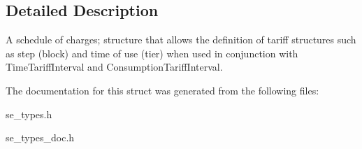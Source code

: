\subsection{Detailed Description}
A schedule of charges; structure that allows the definition of tariff structures such as step (block) and time of use (tier) when used in conjunction with Time\+Tariff\+Interval and Consumption\+Tariff\+Interval. 

The documentation for this struct was generated from the following files\+:\begin{DoxyCompactItemize}
\item 
se\+\_\+types.\+h\item 
se\+\_\+types\+\_\+doc.\+h\end{DoxyCompactItemize}

